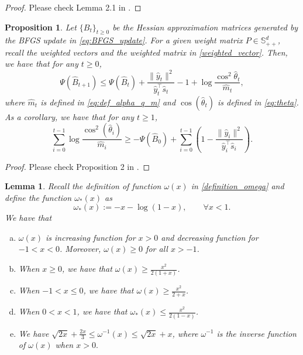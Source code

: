 \documentclass[11pt,letterpaper]{article}
\newcommand\0{{\Vector{0}}}
\newcommand\1{{\Vector{1}}}
\newtheorem{lemma}[theorem]{Lemma}
\newtheorem{proposition}[theorem]{Proposition}
\numberwithin{assumption}{section}
\numberwithin{definition}{section}
\numberwithin{theorem}{section}
\numberwithin{remark}{section}
\begin{document}
\begin{proof}
Please check Lemma 2.1 in \cite{qiujiang2024quasinewton}.
\end{proof}

\begin{proposition}\label{lemma_BFGS}
Let $\{{B}_t\}_{t\geq 0}$ be the Hessian approximation matrices generated by the BFGS update in \eqref{eq:BFGS_update}. For a given weight matrix $P\in \mathbb{S}^d_{++}$, recall the weighted vectors and the weighted matrix in \eqref{weighted_vector}. Then, we have that for any $t \geq 0$,
\begin{equation}\label{eq:potential_decrease}
    \Psi(\hat{B}_{t+1}) \leq \Psi(\hat{B}_t) + \frac{\|\hat{y}_t\|^2}{\hat{y}_t^\top \hat{s}_t} -1 + \log \frac{\cos^2\hat{\theta}_t}{\hat{m}_t},
\end{equation}
where $\hat{m}_t$ is defined in \eqref{eq:def_alpha_q_m} and $\cos(\hat{\theta}_t)$ is defined in \eqref{eq:theta}. As a corollary, we have that for any $t \geq 1$,
\begin{equation}\label{eq:sum_of_logs}
    \sum_{i = 0}^{t - 1} \log{\frac{\cos^2(\hat{\theta}_i)}{\hat{m}_i}} \geq  - \Psi(\hat{B}_{0}) + \sum_{i = 0}^{t - 1}\left(1-\frac{\|\hat{y}_i\|^2}{\hat{y}_i^\top \hat{s}_i} \right).
\end{equation}
\end{proposition}

\begin{proof}
    Please check Proposition 2 in \cite{jin2024non}.
\end{proof}

\begin{lemma}\label{lemma_omega}
Recall the definition of function $\omega(x)$ in \eqref{definition_omega} and define the function $\omega_{*}(x)$ as
\begin{equation}\label{definition_omega_star}
    \omega_{*}(x) := - x - \log{(1 - x)}, \qquad \forall x < 1.
\end{equation}
We have that
\begin{enumerate}[(a)]
    \item $\omega(x)$ is increasing function for $x > 0$ and decreasing function for $-1 < x < 0$. Moreover, $\omega(x) \geq 0$ for all $x > -1$.
    \item When $x \geq 0$, we have that $\omega(x) \geq \frac{x^2}{2(1 + x)}$. 
    \item When $-1 < x \leq 0$, we have that $\omega(x) \geq \frac{x^2}{2 + x}$.
    \item When $0 < x < 1$, we have that $\omega_{*}(x) \leq \frac{x^2}{2(1 - x)}$.
    \item We have $\sqrt{2x} + \frac{2x}{3} \leq \omega^{-1}(x) \leq \sqrt{2x} + x$, where $\omega^{-1}$ is the inverse function of $\omega(x)$ when $x > 0.$
\end{enumerate}
\end{lemma}
\end{document}
